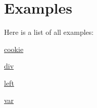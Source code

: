 \section{Examples}
Here is a list of all examples\+:\begin{DoxyCompactItemize}
\item 
\hyperlink{cookie-example}{cookie}
\item 
\hyperlink{div-example}{div}
\item 
\hyperlink{left-example}{left}
\item 
\hyperlink{var-example}{var}
\end{DoxyCompactItemize}

